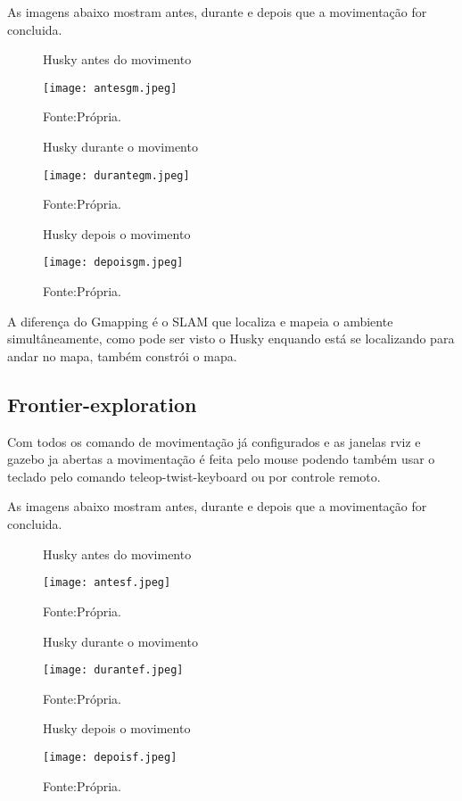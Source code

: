 As imagens abaixo mostram antes, durante e depois que a movimentação for concluida.
\begin{figure} [h!]	
    \centering
    \caption{Husky antes do movimento}
    \texttt{[image: antesgm.jpeg]}
    \caption*{Fonte:Própria.}
    \label{fig:antesgmappinng}
\end{figure}
\begin{figure} [h!]	
    \centering
    \caption{Husky durante o movimento}
    \texttt{[image: durantegm.jpeg]}
    \caption*{Fonte:Própria.}
    \label{fig:durantegmapping}
\end{figure}
\begin{figure} [h!]	
    \centering
    \caption{Husky depois o movimento}
    \texttt{[image: depoisgm.jpeg]}
    \caption*{Fonte:Própria.}
    \label{fig:depoisgmapping}
\end{figure}



A diferença do Gmapping é o SLAM que localiza e mapeia o ambiente simultâneamente, como pode ser visto o Husky enquando está se localizando para andar no mapa, também constrói o mapa.
\subsection{Frontier-exploration}
Com todos os comando de movimentação já configurados e as janelas rviz e gazebo ja abertas a movimentação é feita pelo mouse podendo também usar o teclado pelo comando teleop-twist-keyboard ou por controle remoto.

As imagens abaixo mostram antes, durante e depois que a movimentação for concluida.
\begin{figure} [h!]	
    \centering
    \caption{Husky antes do movimento}
    \texttt{[image: antesf.jpeg]}
    \caption*{Fonte:Própria.}
    \label{fig:antesFrontier-exploration}
\end{figure}
\begin{figure} [h!]	
    \centering
    \caption{Husky durante o movimento}
    \texttt{[image: durantef.jpeg]}
    \caption*{Fonte:Própria.}
    \label{fig:duranteFrontier-exploration}
\end{figure}
\begin{figure} [h!]	
    \centering
    \caption{Husky depois o movimento}
    \texttt{[image: depoisf.jpeg]}
    \caption*{Fonte:Própria.}
    \label{fig:depoisFrontier-exploration}
\end{figure}

